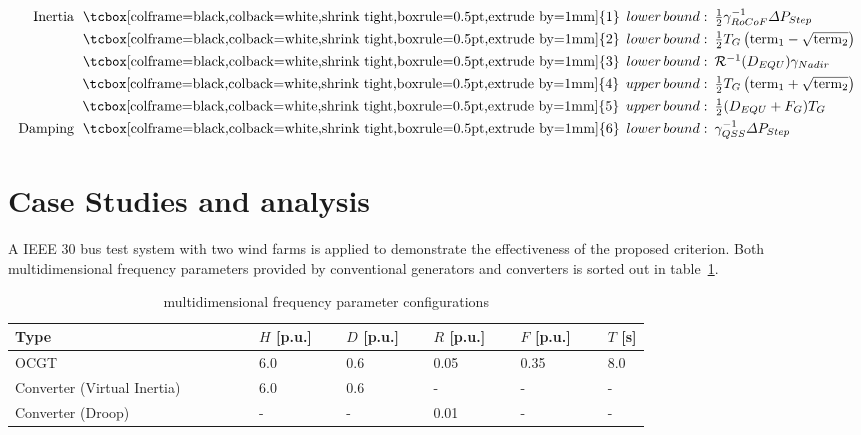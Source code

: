 \documentclass[lettersize,journal]{IEEEtran}
\newcommand{\ciao}[1]{{\setlength\fboxrule{0pt}\fbox{\tcbox[colframe=black,colback=white,shrink tight,boxrule=0.5pt,extrude by=1mm]{\small #1}}}}
\begin{document}
\vspace{-0.25cm}
\begin{subequations}
  \begin{align}
    \!\!\!\begin{array}{rl}
    \text{Inertia}\,\, \ciao{1}\, lower\,bound:&\!\!\!\frac{1}{2} \gamma_{RoCoF}^{-1} \varDelta P_{Step}\\
    \ciao{2}\,lower\,bound:&\!\!\!\frac{1}{2}T_G \left(\text{term}_1 - \sqrt{\text{term}_2} \right)\\
    \ciao{3}\,lower\,bound:&\!\!\!\mathcal{R}^{-1}(D_{EQU}) \gamma_{Nadir} \\
    \ciao{4}\,upper\,bound:&\!\!\!\frac{1}{2}T_G \left(\text{term}_1 + \sqrt{\text{term}_2} \right)\\
    \ciao{5}\,upper\,bound:&\!\!\! \frac{1}{2}(D_{EQU} + F_G) T_G\\
   \text{ Damping} \,\,\ciao{6}\,lower\,bound:&\!\!\! \gamma_{QSS}^{-1} \varDelta P_{Step}\\
    \end{array}
  \end{align}
\end{subequations}

\section{Case Studies and analysis}

A IEEE $30$ bus test system with two wind farms is applied to demonstrate the effectiveness of the proposed criterion. Both multidimensional frequency parameters provided by conventional generators and converters is sorted out in table~\ref{tab:generator_parameters}.

\vspace{-0.25cm}
\begin{table}[!h]
  \centering
  \caption{multidimensional frequency parameter configurations}\vspace{-0.25cm}
  \begin{tabular}{p{0.285\linewidth} p{0.1\linewidth} p{0.1\linewidth} p{0.1\linewidth} p{0.1\linewidth} p{0.05\linewidth}}
      \hline
      \textbf{Type} & $H$ [p.u.] & $D$ [p.u.] & $R$ [p.u.] & $F$ [p.u.] & $T$ [s] \\
      \hline
      \!\!\scriptsize{OCGT} & 6.0 & 0.6 & 0.05 & 0.35 & 8.0 \\
      \!\!\scriptsize{Converter (Virtual Inertia)} & 6.0 & 0.6 & - & - & - \\
      \!\!\scriptsize{Converter (Droop)} & - & - & 0.01 & - & - \\
      \hline
  \end{tabular}
  \label{tab:generator_parameters}
\end{table}
\vspace{-0.25cm}
\end{document}
